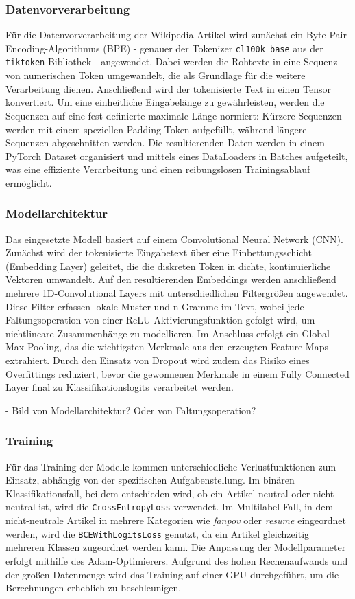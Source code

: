 \subsubsection{Datenvorverarbeitung}
Für die Datenvorverarbeitung der Wikipedia-Artikel wird zunächst ein Byte-Pair-Encoding-Algorithmus (BPE) - genauer der Tokenizer \texttt{cl100k\_base} aus der \texttt{tiktoken}-Bibliothek - angewendet. Dabei werden die Rohtexte in eine Sequenz von numerischen Token umgewandelt, die als Grundlage für die weitere Verarbeitung dienen. Anschließend wird der tokenisierte Text in einen Tensor konvertiert. Um eine einheitliche Eingabelänge zu gewährleisten, werden die Sequenzen auf eine fest definierte maximale Länge normiert: Kürzere Sequenzen werden mit einem speziellen Padding-Token aufgefüllt, während längere Sequenzen abgeschnitten werden. Die resultierenden Daten werden in einem PyTorch Dataset organisiert und mittels eines DataLoaders in Batches aufgeteilt, was eine effiziente Verarbeitung und einen reibungslosen Trainingsablauf ermöglicht.

\subsubsection{Modellarchitektur}
Das eingesetzte Modell basiert auf einem Convolutional Neural Network (CNN). Zunächst wird der tokenisierte Eingabetext über eine Einbettungsschicht (Embedding Layer) geleitet, die die diskreten Token in dichte, kontinuierliche Vektoren umwandelt. Auf den resultierenden Embeddings werden anschließend mehrere 1D-Convolutional Layers mit unterschiedlichen Filtergrößen angewendet. Diese Filter erfassen lokale Muster und n-Gramme im Text, wobei jede Faltungsoperation von einer ReLU-Aktivierungsfunktion gefolgt wird, um nichtlineare Zusammenhänge zu modellieren. Im Anschluss erfolgt ein Global Max-Pooling, das die wichtigsten Merkmale aus den erzeugten Feature-Maps extrahiert. Durch den Einsatz von Dropout wird zudem das Risiko eines Overfittings reduziert, bevor die gewonnenen Merkmale in einem Fully Connected Layer final zu Klassifikationslogits verarbeitet werden.

- Bild von Modellarchitektur? Oder von Faltungsoperation?

\subsubsection{Training}
Für das Training der Modelle kommen unterschiedliche Verlustfunktionen zum Einsatz, abhängig von der spezifischen Aufgabenstellung. Im binären Klassifikationsfall, bei dem entschieden wird, ob ein Artikel neutral oder nicht neutral ist, wird die \texttt{CrossEntropyLoss} verwendet. Im Multilabel-Fall, in dem nicht-neutrale Artikel in mehrere Kategorien wie \textit{fanpov} oder \textit{resume} eingeordnet werden, wird die \texttt{BCEWithLogitsLoss} genutzt, da ein Artikel gleichzeitig mehreren Klassen zugeordnet werden kann. Die Anpassung der Modellparameter erfolgt mithilfe des Adam-Optimierers. Aufgrund des hohen Rechenaufwands und der großen Datenmenge wird das Training auf einer GPU durchgeführt, um die Berechnungen erheblich zu beschleunigen.

